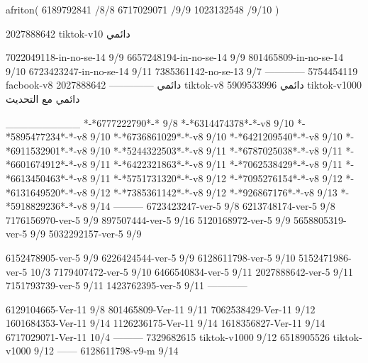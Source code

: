 afriton(
6189792841 /8/8
6717029071 /9/9
1023132548 /9/10
)

2027888642 tiktok-v10
دائمي

7022049118-in-no-se-14 9/9
6657248194-in-no-se-14 9/9
801465809-in-no-se-14 9/10
6723423247-in-no-se-14 9/11
7385361142-no-se-13
9/7
------------
5754454119 facbook-v8
دائمي
--------------
2027888642 tiktok-v8
دائمي
5909533996 tiktok-v1000
دائمي مع التحديث

__________
*-*6777222790*-* 9/8
*-*6314474378*-*-v8 9/10
*-*5895477234*-*-v8 9/10
*-*6736861029*-*-v8 9/10
*-*6421209540*-*-v8 9/10
*-*6911532901*-*-v8 9/10
*-*5244322503*-*-v8 9/11
*-*6787025038*-*-v8 9/11
*-*6601674912*-*-v8 9/11
*-*6422321863*-*-v8 9/11
*-*7062538429*-*-v8 9/11
*-*6613450463*-*-v8 9/11
*-*5751731320*-*-v8 9/12
*-*7095276154*-*-v8 9/12
*-*6131649520*-*-v8 9/12
*-*7385361142*-*-v8 9/12
*-*926867176*-*-v8 9/13
*-*5918829236*-*-v8 9/14
---------
6723423247-ver-5 9/8
6213748174-ver-5 9/8
7176156970-ver-5 9/9
897507444-ver-5 9/16
5120168972-ver-5 9/9
5658805319-ver-5 9/9
5032292157-ver-5 9/9

6152478905-ver-5 9/9
6226424544-ver-5 9/9
6128611798-ver-5 9/10
5152471986-ver-5 10/3
7179407472-ver-5 9/10
6466540834-ver-5 9/11
2027888642-ver-5 9/11
7151793739-ver-5 9/11
1423762395-ver-5 9/11
------------


6129104665-Ver-11
9/8
801465809-Ver-11
9/11
7062538429-Ver-11
9/12
1601684353-Ver-11
9/14
1126236175-Ver-11
9/14
1618356827-Ver-11
9/14
6717029071-Ver-11
10/4
---------
7329682615 tiktok-v1000
9/12
6518905526 tiktok-v1000
9/12
------
6128611798-v9-m
9/14
